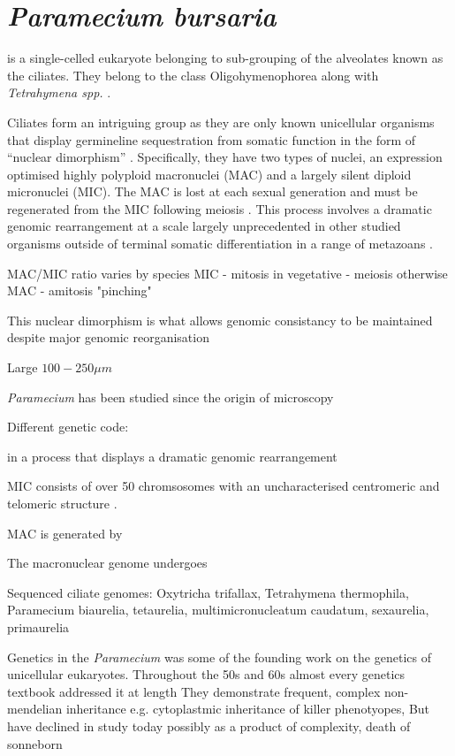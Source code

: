 \section{\textit{Paramecium bursaria}}

 is a single-celled eukaryote belonging to sub-grouping of the alveolates known
as the ciliates. They belong to the class Oligohymenophorea along with \textit{Tetrahymena spp.} \citep{Jahn2002}.

Ciliates form an intriguing group as they are only known unicellular organisms that display germineline 
sequestration from somatic function in the form of ``nuclear dimorphism'' \citep{Jahn2002}.
Specifically, they have two types of nuclei, an expression optimised highly polyploid macronuclei (MAC)
and a largely silent diploid micronuclei (MIC).  The MAC is lost at each sexual generation
and must be regenerated from the MIC following meiosis \citep{Aury2006}.
This process involves a dramatic genomic rearrangement at a scale largely unprecedented in other studied organisms
outside of terminal somatic differentiation in a range of metazoans \citep{Jahn2002}.


MAC/MIC ratio varies by species %
MIC - mitosis in vegetative - meiosis otherwise
MAC - amitosis "pinching"

This nuclear dimorphism is what allows genomic consistancy to be maintained despite major genomic reorganisation

Large \(100-250\mu m\) 


\textit{Paramecium} has been studied since the origin of microscopy \citep{Gortz2009}


Different genetic code:


in a process that displays
a dramatic genomic rearrangement

MIC consists of over 50 chromsosomes with an uncharacterised centromeric and telomeric structure \citep{Aury2006}.

MAC is generated by 



The macronuclear genome undergoes 




Sequenced ciliate genomes: Oxytricha trifallax, Tetrahymena thermophila, Paramecium biaurelia, tetaurelia, multimicronucleatum
caudatum, sexaurelia, primaurelia



Genetics in the \textit{Paramecium} was some of the founding work on the genetics of unicellular eukaryotes.
Throughout the 50s and 60s almost every genetics textbook addressed it at length 
They demonstrate frequent, complex non-mendelian inheritance e.g. cytoplastmic inheritance of killer phenotyopes, 
But have declined in study today possibly as a product of complexity, death of sonneborn \citep{Preer1997}


